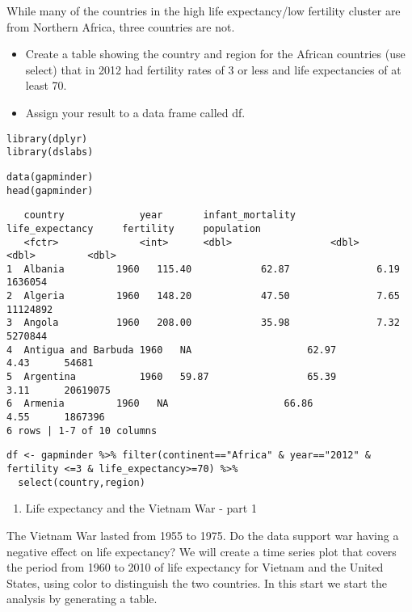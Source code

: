 \documentclass[]{article}
\providecommand{\tightlist}{%
  \setlength{\itemsep}{0pt}\setlength{\parskip}{0pt}}
\begin{document}
While many of the countries in the high life expectancy/low fertility
cluster are from Northern Africa, three countries are not.

\begin{itemize}
\tightlist
\item
  Create a table showing the country and region for the African
  countries (use select) that in 2012 had fertility rates of 3 or less
  and life expectancies of at least 70.
\item
  Assign your result to a data frame called df.
\end{itemize}

\begin{verbatim}
library(dplyr)
library(dslabs)
\end{verbatim}

\begin{verbatim}
data(gapminder)
head(gapminder)
\end{verbatim}

\begin{verbatim}
   country             year       infant_mortality      life_expectancy     fertility     population
   <fctr>              <int>      <dbl>                 <dbl>               <dbl>         <dbl>
1  Albania         1960   115.40            62.87               6.19      1636054   
2  Algeria         1960   148.20            47.50               7.65      11124892  
3  Angola          1960   208.00            35.98               7.32      5270844   
4  Antigua and Barbuda 1960   NA                    62.97               4.43      54681 
5  Argentina           1960   59.87                 65.39               3.11      20619075  
6  Armenia         1960   NA                    66.86               4.55      1867396   
6 rows | 1-7 of 10 columns
\end{verbatim}

\begin{verbatim}
df <- gapminder %>% filter(continent=="Africa" & year=="2012" & fertility <=3 & life_expectancy>=70) %>%
  select(country,region)
\end{verbatim}

\begin{enumerate}
\def\labelenumi{\arabic{enumi}.}
\setcounter{enumi}{3}
\tightlist
\item
  Life expectancy and the Vietnam War - part 1
\end{enumerate}

The Vietnam War lasted from 1955 to 1975. Do the data support war having
a negative effect on life expectancy? We will create a time series plot
that covers the period from 1960 to 2010 of life expectancy for Vietnam
and the United States, using color to distinguish the two countries. In
this start we start the analysis by generating a table.
\end{document}
